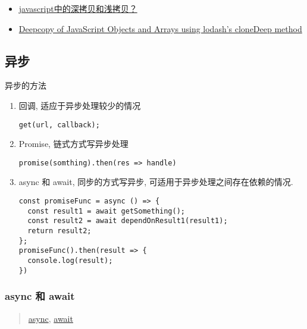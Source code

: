 \begin{itemize}
\tightlist
\item
  \href{https://www.zhihu.com/question/23031215}{javascript中的深拷贝和浅拷贝？}
\item
  \href{http://blog.bogdancarpean.com/deepcopy-of-javascript-objects-and-arrays-using-lodashs-clonedeep-method/}{Deepcopy
  of JavaScript Objects and Arrays using lodash's cloneDeep method}
\end{itemize}

\subsection{异步}\label{ux5f02ux6b65}

异步的方法

\begin{enumerate}
\def\labelenumi{\arabic{enumi}.}
\item
  回调, 适应于异步处理较少的情况

\begin{lstlisting}
get(url, callback);
\end{lstlisting}
\item
  Promise, 链式方式写异步处理

\begin{lstlisting}
promise(somthing).then(res => handle)
\end{lstlisting}
\item
  async 和 await, 同步的方式写异步, 可适用于异步处理之间存在依赖的情况.

\begin{lstlisting}
const promiseFunc = async () => {
  const result1 = await getSomething();
  const result2 = await dependOnResult1(result1);
  return result2;
};
promiseFunc().then(result => {
  console.log(result);
})
\end{lstlisting}
\end{enumerate}

\subsubsection{async 和 await}\label{async-ux548c-await}

\begin{quote}
\href{https://developer.mozilla.org/en-US/docs/Web/JavaScript/Reference/Statements/async_function}{async},
\href{https://developer.mozilla.org/en-US/docs/Web/JavaScript/Reference/Operators/await}{await}
\end{quote}


